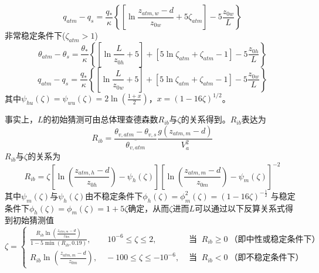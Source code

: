 \begin{equation}
q_{atm}-q_{s}=\frac{q_{*}}{\kappa}\left\{\left[\ln \frac{z_{atm, w}-d}{z_{0 w}}+5 \zeta_{atm}\right]-5 \frac{z_{0 w}}{L}\right\}
\end{equation}
非常稳定条件下($\zeta_{atm}>1$)
\begin{equation}\label{theta_VS}
\theta_{atm}-\theta_{s}=\frac{\theta_{*}}{\kappa}\left\{\left[\ln \frac{L}{z_{0 h}}+5\right]
+\left[5 \ln \zeta_{atm}+\zeta_{atm}-1\right]-5 \frac{z_{0 h}}{L}\right\}
\end{equation}
\begin{equation}\label{q_VS}
q_{atm}-q_{s}=\frac{q_{*}}{\kappa}\left\{\left[\ln \frac{L}{z_{0 w}}+5\right]
+\left[5 \ln \zeta_{atm}+\zeta_{atm}-1\right]-5 \frac{z_{0 w}}{L}\right\}
\end{equation}
其中$\psi_{hu}\left(\zeta\right)=\psi_{wu}\left(\zeta\right)=2\ln{\left(\frac{1+x}{2}\right)}$，$x={(1-16\zeta)}^{1/2}$。

事实上，$L$的初始猜测可由总体理查德森数$R_{ib}$与$\zeta$的关系得到\citep{arya2001introduction}。$R_{ib}$表达为
\begin{equation}\label{Rib}
R_{i b}=\frac{\theta_{v, atm}-\theta_{v, s}}{\overline{\theta_{v, atm}}} \frac{g\left(z_{atm, m}-d\right)}{V_{a}^{2}}
\end{equation}
$R_{ib}$与$\zeta$的关系为
\begin{equation}
R_{ib}=\zeta\left[\ln{\left(\frac{z_{atm,h}-d}{z_{0h}}\right)-\psi_h(\zeta)}\right] \left[\ln{\left(\frac{z_{atm,m}-d}{z_{0m}}\right)-\psi_m(\zeta)}\right]^{-2}
\end{equation}
其中$\psi_m(\zeta)$与$\psi_h(\zeta)$由不稳定条件下$\phi_h\left(\zeta\right)=\phi_m^2\left(\zeta\right)=\left(1-16\zeta\right)^{-\frac{1}{2}}$ 
与稳定条件下$\phi_h\left(\zeta\right)=\phi_m\left(\zeta\right)=1+5\zeta$确定，从而$\zeta$进而$L$可以通过以下反算关系式得到初始猜测值
\begin{equation}\label{ZetaRib}
  \zeta=\begin{cases}
    \frac{R_{i b} \ln \left(\frac{z_{atm, m}-d}{z_{0 m}}\right)}{1-5 \min \left(R_{i b}, 0.19\right)}, \qquad 10^{-6} \leqslant \zeta \leqslant 2, & \text{ 当 }\ R_{i b} \geqslant 0\ \text{（即中性或稳定条件下）} \\
    R_{ib} \ln \left(\frac{z_{atm, m}-d}{z_{0 m}}\right),  \quad -100 \leqslant \zeta \leqslant-10^{-6}, & \text{ 当 }\ R_{i b}<0\ \text{（即不稳定条件下）}
  \end{cases}
\end{equation}

